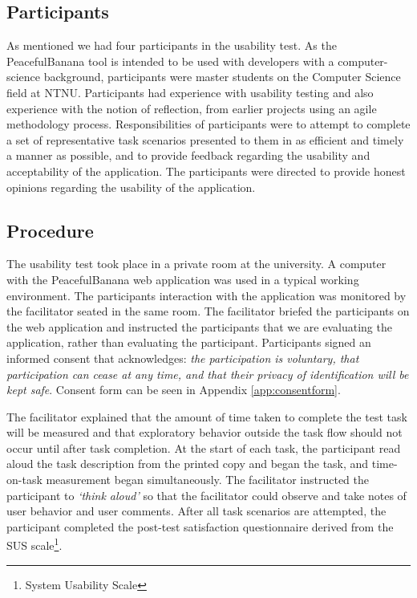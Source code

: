\subsection{Participants}
As mentioned we had four participants in the usability test. As the PeacefulBanana tool is intended to be used with developers with a computer-science background, participants were master students on the Computer Science field at NTNU. Participants had experience with usability testing and also experience with the notion of reflection, from earlier projects using an agile methodology process.
Responsibilities of participants were to attempt to complete a set of representative task scenarios presented to them in as efficient and timely a manner as possible, and to provide feedback regarding the usability and acceptability of the application. The participants were directed to provide honest opinions regarding the usability of the application.

\subsection{Procedure}
The usability test took place in a private room at the university. A computer with the PeacefulBanana web application was used in a typical working environment. The participants interaction with the application was monitored by the facilitator seated in the same room.
The facilitator briefed the participants on the web application and instructed the participants that we are evaluating the application, rather than evaluating the participant. Participants signed an informed consent that acknowledges: \emph{the participation is voluntary, that participation can cease at any time, and that their privacy of identification will be kept safe}. Consent form can be seen in Appendix \ref{app:consentform}.

The facilitator explained that the amount of time taken to complete the test task will be measured and that exploratory behavior outside the task flow should not occur until after task completion. At the start of each task, the participant read aloud the task description from the printed copy and began the task, and time-on-task measurement began simultaneously.
The facilitator instructed the participant to \emph{‘think aloud’} so that the facilitator could observe and take notes of user behavior and user comments.
After all task scenarios are attempted, the participant completed the post-test satisfaction questionnaire derived from the SUS scale\footnote{System Usability Scale}.


